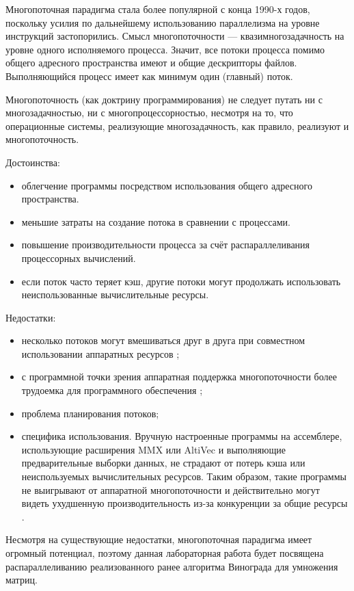 \documentclass[a4paper,14pt]{extreport}
\begin{document}
Многопоточная парадигма стала более популярной с конца 1990-х годов, поскольку усилия по дальнейшему использованию параллелизма на уровне инструкций застопорились.
Смысл многопоточности — квазимногозадачность на уровне одного исполняемого процесса.
Значит, все потоки процесса помимо общего адресного пространства имеют и общие дескрипторы файлов. Выполняющийся процесс имеет как минимум один (главный) поток.

Многопоточность (как доктрину программирования) не следует путать ни с многозадачностью, ни с многопроцессорностью, несмотря на то, что операционные системы, реализующие многозадачность, как правило, реализуют и многопоточность.

Достоинства:
\begin{itemize}
	\item облегчение программы посредством использования общего адресного пространства.
	\item меньшие затраты на создание потока в сравнении с процессами.
	\item повышение производительности процесса за счёт распараллеливания процессорных вычислений.
	\item если поток часто теряет кэш, другие потоки могут продолжать использовать неиспользованные вычислительные ресурсы.
\end{itemize}

Недостатки:
\begin{itemize}
	\item несколько потоков могут вмешиваться друг в друга при совместном использовании аппаратных ресурсов \cite{Nemirovsky};
	\item с программной точки зрения аппаратная поддержка многопоточности более трудоемка для программного обеспечения \cite{Olukotun};
	\item проблема планирования потоков;
	\item специфика использования. Вручную настроенные программы на ассемблере, использующие расширения MMX или AltiVec и выполняющие предварительные выборки данных, не страдают от потерь кэша или неиспользуемых вычислительных ресурсов. Таким образом, такие программы не выигрывают от аппаратной многопоточности и действительно могут видеть ухудшенную производительность из-за конкуренции за общие ресурсы \cite{intel}.
\end{itemize}
Несмотря на существующие недостатки, многопоточная парадигма имеет огромный потенциал, поэтому данная лабораторная работа будет посвящена распараллеливанию реализованного ранее алгоритма Винограда для умножения матриц.\\
\end{document}
